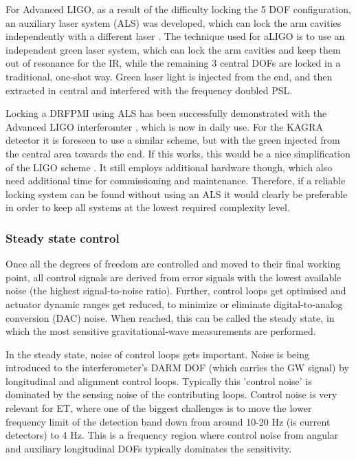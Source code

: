 For Advanced LIGO, as a result of the difficulty locking the 5 DOF configuration, an auxiliary laser system (ALS) was developed, which can lock the arm cavities independently with a different laser \cite{LIGO_ALS1, LIGO_ALS2}.  The technique used for aLIGO is to use an independent green laser system, which can lock the arm cavities and keep them out of resonance for the IR, while the remaining 3 central DOFs are locked in a traditional, one-shot way. Green laser light is injected from the end, and then extracted in central and interfered with the frequency doubled PSL.


Locking a DRFPMI using ALS has been successfully demonstrated with the Advanced LIGO interferomter \cite{aLIGO_lock_acquisition}, which is now in daily use. For the KAGRA detector it is foreseen to use a similar scheme, but with the green injected from the central area towards the end. If this works, this would be a nice simplification of the LIGO scheme \cite{KAGRA_ALS}.
It still employs additional hardware though, which also need additional time for commissioning and maintenance. Therefore, if a reliable locking system can be found without using an ALS it would clearly 
be preferable in order to keep all systems at the lowest required complexity level.


\subsubsection*{Steady state control}

Once all the degrees of freedom are controlled and moved to their final working point, all control signals are derived from error signals with the lowest available noise (the highest signal-to-noise ratio). Further, control loops get optimised and actuator dynamic ranges get reduced, to minimize or eliminate digital-to-analog conversion (DAC) noise. When reached, this can be called the steady state, in which the most sensitive gravitational-wave measurements are performed. 

In the steady state, noise of control loops gets important. Noise is being introduced to the interferometer's DARM DOF (which carries the GW signal) by longitudinal and alignment control loops. Typically this 'control noise' is dominated by the sensing noise of the contributing loops.
Control noise is very relevant for ET, where one of the biggest challenges is to move the lower frequency limit of the detection band down from around 10-20 Hz (is current detectors) to 4 Hz. This is a frequency region where control noise from angular and auxiliary longitudinal DOFs typically dominates the sensitivity.

